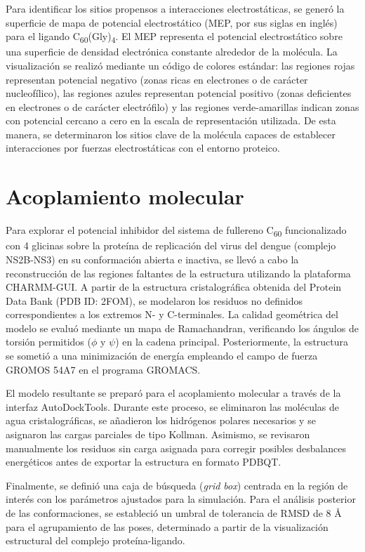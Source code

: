 Para identificar los sitios propensos a interacciones electrostáticas, se generó la superficie de mapa de potencial electrostático (MEP, por sus siglas en inglés) para el ligando C\textsubscript{60}(Gly)\textsubscript{4}. El MEP representa el potencial electrostático sobre una superficie de densidad electrónica constante alrededor de la molécula. La visualización se realizó mediante un código de colores estándar: las regiones rojas representan potencial negativo (zonas ricas en electrones o de carácter nucleofílico), las regiones azules representan potencial positivo (zonas deficientes en electrones o de carácter electrófilo) y las regiones verde-amarillas indican zonas con potencial cercano a cero en la escala de representación utilizada. De esta manera, se determinaron los sitios clave de la molécula capaces de establecer interacciones por fuerzas electrostáticas con el entorno proteico.

\section{Acoplamiento molecular}
Para explorar el potencial inhibidor del sistema de fullereno C\textsubscript{60} funcionalizado con 4 glicinas sobre la proteína de replicación del virus del dengue (complejo NS2B-NS3) en su conformación abierta e inactiva, se llevó a cabo la reconstrucción de las regiones faltantes de la estructura utilizando la plataforma CHARMM-GUI. A partir de la estructura cristalográfica obtenida del Protein Data Bank (PDB ID: 2FOM), se modelaron los residuos no definidos correspondientes a los extremos N- y C-terminales. La calidad geométrica del modelo se evaluó mediante un mapa de Ramachandran, verificando los ángulos de torsión permitidos ($\phi$ y $\psi$) en la cadena principal. Posteriormente, la estructura se sometió a una minimización de energía empleando el campo de fuerza GROMOS 54A7 en el programa GROMACS.

El modelo resultante se preparó para el acoplamiento molecular a través de la interfaz AutoDockTools. Durante este proceso, se eliminaron las moléculas de agua cristalográficas, se añadieron los hidrógenos polares necesarios y se asignaron las cargas parciales de tipo Kollman. Asimismo, se revisaron manualmente los residuos sin carga asignada para corregir posibles desbalances energéticos antes de exportar la estructura en formato PDBQT.

Finalmente, se definió una caja de búsqueda (\textit{grid box}) centrada en la región de interés con los parámetros ajustados para la simulación. Para el análisis posterior de las conformaciones, se estableció un umbral de tolerancia de RMSD de 8 Å para el agrupamiento de las poses, determinado a partir de la visualización estructural del complejo proteína-ligando.
